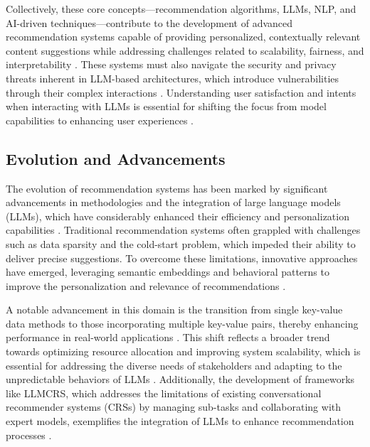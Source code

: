 Collectively, these core concepts—recommendation algorithms, LLMs, NLP, and AI-driven techniques—contribute to the development of advanced recommendation systems capable of providing personalized, contextually relevant content suggestions while addressing challenges related to scalability, fairness, and interpretability . These systems must also navigate the security and privacy threats inherent in LLM-based architectures, which introduce vulnerabilities through their complex interactions \cite{hua2023tutorial}. Understanding user satisfaction and intents when interacting with LLMs is essential for shifting the focus from model capabilities to enhancing user experiences \cite{wang2023multiple}.



\subsection{Evolution and Advancements} \label{subsec:Evolution and Advancements}



The evolution of recommendation systems has been marked by significant advancements in methodologies and the integration of large language models (LLMs), which have considerably enhanced their efficiency and personalization capabilities . Traditional recommendation systems often grappled with challenges such as data sparsity and the cold-start problem, which impeded their ability to deliver precise suggestions. To overcome these limitations, innovative approaches have emerged, leveraging semantic embeddings and behavioral patterns to improve the personalization and relevance of recommendations \cite{wu2023exploringlargelanguagemodel}.



A notable advancement in this domain is the transition from single key-value data methods to those incorporating multiple key-value pairs, thereby enhancing performance in real-world applications \cite{wang2023multiple}. This shift reflects a broader trend towards optimizing resource allocation and improving system scalability, which is essential for addressing the diverse needs of stakeholders and adapting to the unpredictable behaviors of LLMs \cite{li2024llmr2largelanguagemodel}. Additionally, the development of frameworks like LLMCRS, which addresses the limitations of existing conversational recommender systems (CRSs) by managing sub-tasks and collaborating with expert models, exemplifies the integration of LLMs to enhance recommendation processes \cite{feng2023largelanguagemodelenhanced}.



